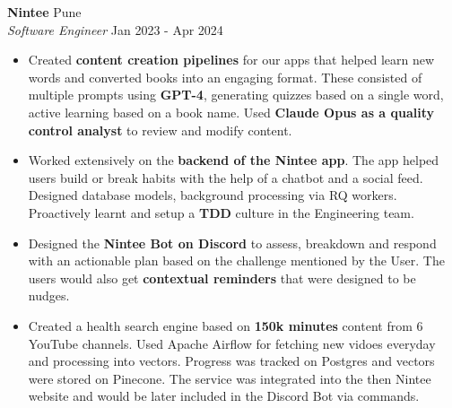 \documentclass[a4paper]{article}
\begin{document}
\vspace{1mm}
\textbf{Nintee} \hfill Pune\\
\textit{Software Engineer} \hfill Jan 2023 - Apr 2024\\
\vspace{-1mm}
\begin{itemize} \itemsep 1pt
    \item Created \textbf{content creation pipelines} for our apps that helped learn new words and converted books into an engaging format. These consisted of multiple prompts using \textbf{GPT-4}, generating quizzes based on a single word, active learning based on a book name. Used \textbf{Claude Opus as a quality control analyst} to review and modify content.
    \item Worked extensively on the \textbf{backend of the Nintee app}. The app helped users build or break habits with the help of a chatbot and a social feed. Designed database models, background processing via RQ workers. Proactively learnt and setup a \textbf{TDD} culture in the Engineering team.
    \item Designed the \textbf{Nintee Bot on Discord} to assess, breakdown and respond with an actionable plan based on the challenge mentioned by the User. The users would also get \textbf{contextual reminders} that were designed to be nudges.
    \item Created a health search engine based on \textbf{150k minutes} content from 6 YouTube channels. Used Apache Airflow for fetching new vidoes everyday and processing into vectors. Progress was tracked on Postgres and vectors were stored on Pinecone. The service was integrated into the then Nintee website and would be later included in the Discord Bot via commands.
\end{itemize}

\vspace*{2mm}
\end{document}
